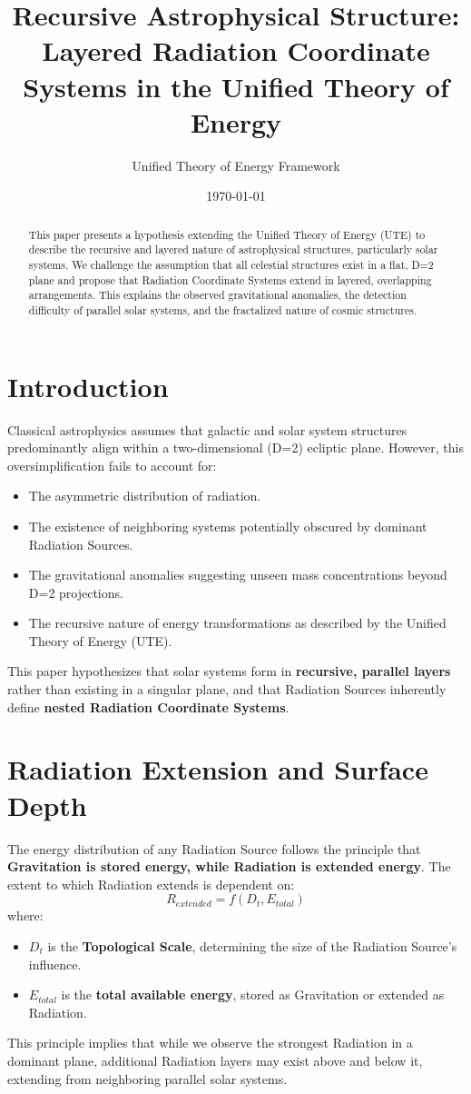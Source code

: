 \documentclass{article}
\title{Recursive Astrophysical Structure: Layered Radiation Coordinate Systems in the Unified Theory of Energy}
\author{Unified Theory of Energy Framework}
\date{\today}
\begin{document}
\maketitle

\begin{abstract}
This paper presents a hypothesis extending the Unified Theory of Energy (UTE) to describe the recursive and layered nature of astrophysical structures, particularly solar systems. We challenge the assumption that all celestial structures exist in a flat, D=2 plane and propose that Radiation Coordinate Systems extend in layered, overlapping arrangements. This explains the observed gravitational anomalies, the detection difficulty of parallel solar systems, and the fractalized nature of cosmic structures.
\end{abstract}

\section{Introduction}
Classical astrophysics assumes that galactic and solar system structures predominantly align within a two-dimensional (D=2) ecliptic plane. However, this oversimplification fails to account for:
\begin{itemize}
    \item The asymmetric distribution of radiation.
    \item The existence of neighboring systems potentially obscured by dominant Radiation Sources.
    \item The gravitational anomalies suggesting unseen mass concentrations beyond D=2 projections.
    \item The recursive nature of energy transformations as described by the Unified Theory of Energy (UTE).
\end{itemize}
This paper hypothesizes that solar systems form in \textbf{recursive, parallel layers} rather than existing in a singular plane, and that Radiation Sources inherently define \textbf{nested Radiation Coordinate Systems}.

\section{Radiation Extension and Surface Depth}
The energy distribution of any Radiation Source follows the principle that \textbf{Gravitation is stored energy, while Radiation is extended energy}. The extent to which Radiation extends is dependent on:
\begin{equation}
    R_{extended} = f(D_t, E_{total})
\end{equation}
where:
\begin{itemize}
    \item $D_t$ is the \textbf{Topological Scale}, determining the size of the Radiation Source’s influence.
    \item $E_{total}$ is the \textbf{total available energy}, stored as Gravitation or extended as Radiation.
\end{itemize}
This principle implies that while we observe the strongest Radiation in a dominant plane, additional Radiation layers may exist above and below it, extending from neighboring parallel solar systems.
\end{document}

